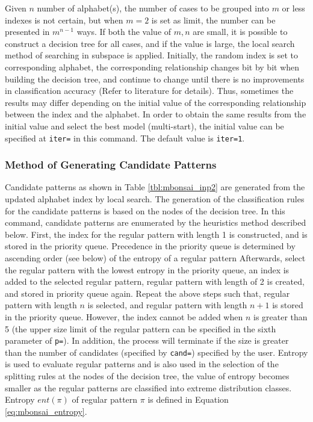 Given $n$ number of alphabet(s), the number of cases to be grouped into $m$ or less indexes is not certain, but when $m=2$ is set as limit, the number can be presented in $m^{n-1}$ ways. If both the value of $m,n$ are small, it is possible to construct a decision tree for all cases, and if the value is large, the local search method of searching in subspace is applied. Initially, the random index is set to corresponding alphabet, the corresponding relationship changes bit by bit when building the decision tree, and continue to change until there is no improvements in classification accuracy (Refer to literature \cite{SSS94} for details). Thus, sometimes the results may differ depending on the initial value of the corresponding relationship between the index and the alphabet. In order to obtain the same results from the initial value and select the best model (multi-start),  the initial value can be specified at \verb|iter=| in this command. The default value is \verb|iter=1|.


\subsubsection{Method of Generating Candidate Patterns }
Candidate patterns as shown in Table \ref{tbl:mbonsai_inp2} are generated from the updated alphabet index by local search. The generation of the classification rules for the candidate patterns is based on the nodes of the decision tree. In this command, candidate patterns are enumerated by the heuristics method described below.  First, the index for the regular pattern with length 1 is constructed, and is stored in the priority queue. Precedence in the priority queue is determined by ascending order (see below) of the entropy of a regular pattern Afterwards, select the regular pattern with the lowest entropy in the priority queue, an index is added to the selected regular pattern, regular pattern with length of 2 is created, and stored in priority queue again. Repeat the above steps such that, regular pattern with length $n$ is selected, and regular pattern with length $n+1$ is stored in the priority queue. However,  the index cannot be added when $n$ is greater than 5 (the upper size limit of the regular pattern can be specified in the sixth parameter of \verb|p=|).  In addition, the process will terminate if the size is greater than the number of candidates (specified by \verb|cand=|) specified by the user. Entropy is used to evaluate regular patterns and is also used in the selection of the splitting rules at the nodes of the decision tree, the value of entropy becomes smaller as the regular patterns are classified into extreme distribution classes. Entropy $ent(\pi)$ of regular pattern $\pi$ is defined in Equation \ref{eq:mbonsai_entropy}.


